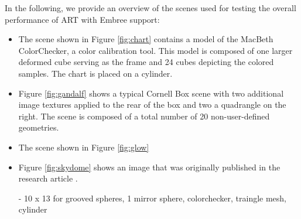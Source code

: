 \noindent In the following, we provide an overview of the scenes used for testing the overall performance of ART with Embree support:
\begin{itemize}
	\setlength\itemsep{0.05em}
	
	\item The scene shown in Figure \ref{fig:chart} contains a model of the MacBeth ColorChecker, a color calibration tool. This model is composed of one larger deformed cube serving as the frame and 24 cubes depicting the colored samples. The chart is placed on a cylinder.
	
	\item Figure \ref{fig:gandalf} shows a typical Cornell Box scene with two additional image textures applied to the rear of the box and two a quadrangle on the right. The scene is composed of a total number of 20 non-user-defined geometries.
	
	\item The scene shown in Figure \ref{fig:glow} \cite{wilkie2011physically}
	
	\item Figure \ref{fig:skydome} shows an image that was originally published in the research article  \cite{wilkie2013predicting}.
	
	- 10 x 13 for grooved spheres, 1 mirror sphere, colorchecker, traingle mesh, cylinder
	
	
\end{itemize}


